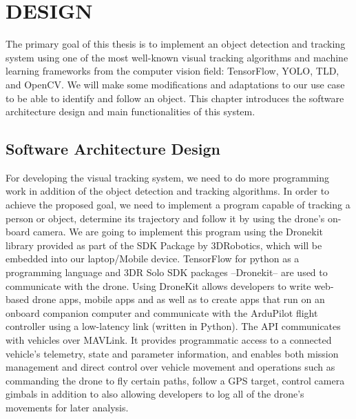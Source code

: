 %
%
%

\chapter{\uppercase{Design}}

The primary goal of this thesis is to implement an object detection and tracking system using one of the most well-known visual tracking algorithms and machine learning frameworks from the computer vision field: TensorFlow, YOLO, TLD, and OpenCV. We will make some modifications and adaptations to our use case to be able to identify and follow an object. This chapter introduces the software architecture design and main functionalities of this system.

\section{Software Architecture Design}

For developing the visual tracking system, we need to do more programming work in addition of the object detection and tracking algorithms. In order to achieve the proposed goal, we need to implement a program capable of tracking a person or object, determine its trajectory and follow it by using the drone’s on-board camera. We are going to implement this program using the Dronekit library provided as part of the SDK Package by 3DRobotics, which will be embedded into our laptop/Mobile device. TensorFlow for python as a programming language and 3DR Solo SDK packages --Dronekit-- are used to communicate with the drone. Using DroneKit allows developers to write web-based drone apps, mobile apps and as well as to create apps that run on an onboard companion computer and communicate with the ArduPilot flight controller using a low-latency link (written in Python). The API communicates with vehicles over MAVLink. It provides programmatic access to a connected vehicle’s telemetry, state and parameter information, and enables both mission management and direct control over vehicle movement and operations such as commanding the drone to fly certain paths, follow a GPS target, control camera gimbals in addition to also allowing developers to log all of the drone’s movements for later analysis.

